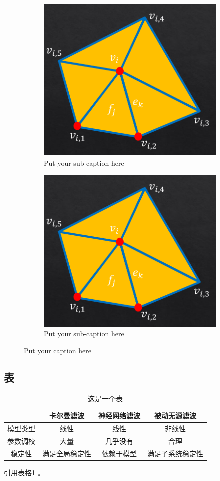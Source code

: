 \documentclass[12pt]{article} %
\begin{document}
\begin{figure}[!htb]
\begin{subfigure}{.49\textwidth}
    \includegraphics[width=.8\linewidth]{mesh.png}  
    \caption{Put your sub-caption here}
    \label{fig:sub-third}
  \end{subfigure}
  \begin{subfigure}{.49\textwidth}
    \centering
    \includegraphics[width=.8\linewidth]{mesh.png}  
    \caption{Put your sub-caption here}
    \label{fig:sub-fourth}
  \end{subfigure}
  \caption{Put your caption here}
  \label{fig:complex}
  \end{figure}

\subsection{表}
\begin{table}[ht]
\caption{这是一个表}
\label{tb:filter}
\centering
\begin{tabular}{cccc}
\hline
 & 卡尔曼滤波 & 神经网络滤波 & 被动无源滤波 \\ 
\hline
模型类型 & 线性 & 线性 & 非线性 \\ 
参数调校 & 大量 & 几乎没有 & 合理 \\ 
稳定性 & 满足全局稳定性 & 依赖于模型 & 满足子系统稳定性 \\ 
\hline
\end{tabular} 
\end{table}
引用表格\ref{tb:filter} 。
\end{document}
